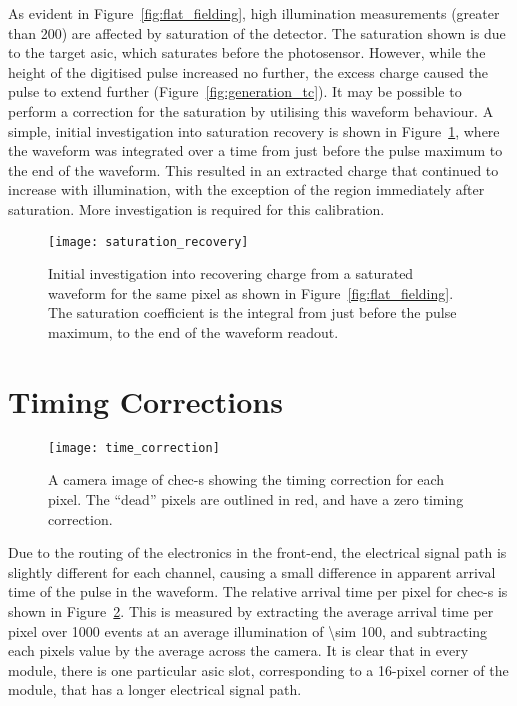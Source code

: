 As evident in Figure~\ref{fig:flat_fielding}, high illumination measurements (greater than \utilde\SI{200}{\pe}) are affected by saturation of the detector. The saturation shown is due to the \gls{target} \gls{asic}, which saturates before the photosensor. However, while the height of the digitised pulse increased no further, the excess charge caused the pulse to extend further (Figure~\ref{fig:generation_tc}). It may be possible to perform a correction for the saturation by utilising this waveform behaviour. A simple, initial investigation into saturation recovery is shown in Figure~\ref{fig:saturation_recovery}, where the waveform was integrated over a time from just before the pulse maximum to the end of the waveform. This resulted in an extracted charge that continued to increase with illumination, with the exception of the region immediately after saturation. More investigation is required for this calibration.

\begin{figure}[H]
	\centering
    \texttt{[image: saturation\_recovery]} 
	\caption[Saturation Recovery.]{Initial investigation into recovering charge from a saturated waveform for the same pixel as shown in Figure~\ref{fig:flat_fielding}. The saturation coefficient is the integral from just before the pulse maximum, to the end of the waveform readout.}
	\label{fig:saturation_recovery}
\end{figure}

\section{Timing Corrections} \label{section:timing_corrections}

\begin{figure}
	\centering
    \texttt{[image: time\_correction]} 
	\caption[Pulse timing correction for each pixel.]{A camera image of \gls{chec-s} showing the timing correction for each pixel. The ``dead'' pixels are outlined in red, and have a zero timing correction.}
	\label{fig:time_correction}
\end{figure}

Due to the routing of the electronics in the front-end, the electrical signal path is slightly different for each channel, causing a small difference in apparent arrival time of the pulse in the waveform. The relative arrival time per pixel for \gls{chec-s} is shown in Figure~\ref{fig:time_correction}. This is measured by extracting the average arrival time per pixel over 1000 events at an average illumination of \SI{\sim 100}{\pe}, and subtracting each pixels value by the average across the camera. It is clear that in every module, there is one particular \gls{asic} slot, corresponding to a 16-pixel corner of the module, that has a longer electrical signal path. 

